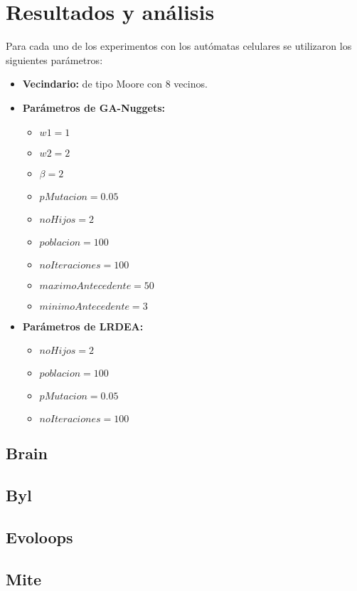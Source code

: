 \chapter{Resultados y análisis}

Para cada uno de los experimentos con los autómatas celulares se utilizaron los siguientes parámetros:

\begin{itemize}
	\item \textbf{Vecindario:} de tipo Moore con 8 vecinos.
	\item \textbf{Parámetros de GA-Nuggets:}
	\begin{itemize}
		\item $w1=1$ 
		\item $w2=2$ 
		\item $\beta=2$ 
		\item $pMutacion=0.05$
		\item $noHijos=2$ 
		\item $poblacion=100$ 
		\item $noIteraciones=100$
		\item $maximoAntecedente=50$
		\item $minimoAntecedente=3$
	\end{itemize}
	\item \textbf{Parámetros de LRDEA:}
	\begin{itemize}
		\item $noHijos=2$
		\item $poblacion=100$
		\item $pMutacion=0.05$
		\item $noIteraciones=100$
	\end{itemize}
\end{itemize}

\section{Brain}

\section{Byl}

\section{Evoloops}

\section{Mite}